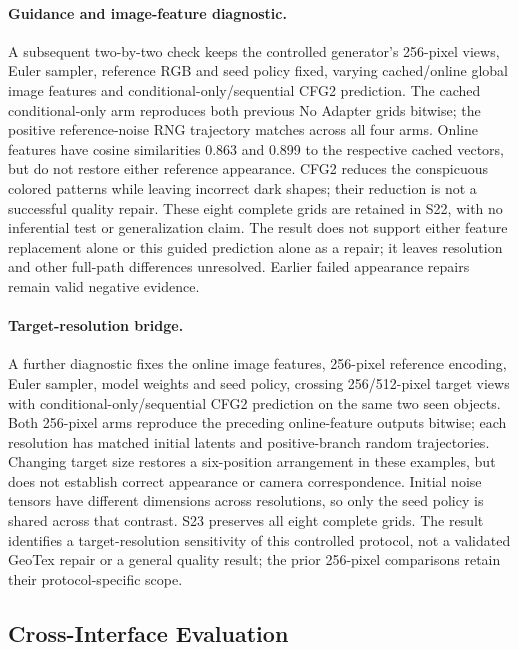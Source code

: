 \documentclass[times,twocolumn,final]{elsarticle}
\begin{document}
\paragraph{Guidance and image-feature diagnostic.}
A subsequent two-by-two check keeps the controlled generator's 256-pixel views, Euler sampler, reference RGB and seed policy fixed, varying cached/online global image features and conditional-only/sequential CFG2 prediction. The cached conditional-only arm reproduces both previous No Adapter grids bitwise; the positive reference-noise RNG trajectory matches across all four arms. Online features have cosine similarities 0.863 and 0.899 to the respective cached vectors, but do not restore either reference appearance. CFG2 reduces the conspicuous colored patterns while leaving incorrect dark shapes; their reduction is not a successful quality repair. These eight complete grids are retained in S22, with no inferential test or generalization claim. The result does not support either feature replacement alone or this guided prediction alone as a repair; it leaves resolution and other full-path differences unresolved. Earlier failed appearance repairs remain valid negative evidence.

\paragraph{Target-resolution bridge.}
A further diagnostic fixes the online image features, 256-pixel reference encoding, Euler sampler, model weights and seed policy, crossing 256/512-pixel target views with conditional-only/sequential CFG2 prediction on the same two seen objects. Both 256-pixel arms reproduce the preceding online-feature outputs bitwise; each resolution has matched initial latents and positive-branch random trajectories. Changing target size restores a six-position arrangement in these examples, but does not establish correct appearance or camera correspondence. Initial noise tensors have different dimensions across resolutions, so only the seed policy is shared across that contrast. S23 preserves all eight complete grids. The result identifies a target-resolution sensitivity of this controlled protocol, not a validated GeoTex repair or a general quality result; the prior 256-pixel comparisons retain their protocol-specific scope.

\subsection{Cross-Interface Evaluation}
\label{subsec:cross-interface}
\end{document}
